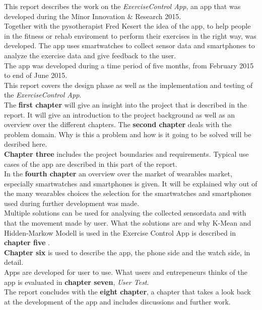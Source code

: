 This report describes the work on the \emph{ExerciseControl App}, an app that was developed during the Minor Innovation \& Research 2015.\\
Together with the pysotherapist Fred Kesert the idea of the app, to help people in the fitness or rehab enviroment to perform their exercises in the right way, was developed. The app uses smartwatches to collect sensor data and smartphones to analyze the exercise data and give feedback to the user. \\
The app was developed during a time period of five months, from February 2015 to end of June 2015. \\
This report covers the design phase as well as the implementation and testing of the \emph{ExerciseControl App}.\\
The \textbf{first chapter} will give an insight into the project that is described in the report. It will give an introduction to the project background as well as an overview over the different chapters.
The \textbf{second chapter} deals with the problem domain. Why is this a problem and how is it going to be solved will be desribed here.\\
\textbf{Chapter three} includes the project boundaries and requirements. Typical use cases of the app are described in this part of the report.
\\
In the \textbf{fourth chapter} an overview over the market of wearables market, especially smartwatches and smartphones is given. It will be explained why out of the many wearables choices the selection for the smartwatches and smartphones used during further development was made.
\\
 Multiple solutions can be used for analysing the collected sensordata and with that the movement made by user. What the solutions are and why K-Mean and Hidden-Markow Modell is used in the Exercise Control App is described in \textbf{chapter five} .
\\
\textbf{Chapter six} is used to describe the app, the phone side and the watch side, in detail.
\\
Apps are developed for user to use. What users and entrepeneurs thinks of the app is evaluated in \textbf{chapter seven}, \emph{User Test}.
\\
The report concludes with the \textbf{eight chapter}, a chapter that takes a look back at the development of the app and includes discussions and further work.

